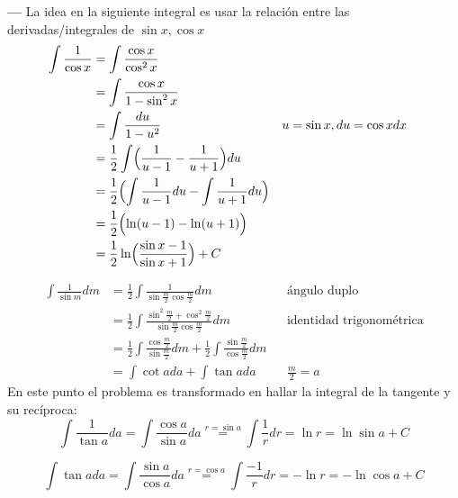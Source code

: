 \documentclass[14pt]{extarticle}
\begin{document}
\textbf{---} La idea en la siguiente integral es usar la relación entre las derivadas/integrales de $\sin x, \cos x$
\begin{align}
      \int \frac{1}{\cos x}
       & = \int \frac{\cos x}{\cos^2 x}                                                                                   \\
       & = \int \frac{\cos x}{1-\sin^2 x}                                                                                 \\
       & = \int \frac{du}{1-u^2}                                                 &  & \text{$u = \sin x, du = \cos x dx$} \\
       & = \frac{1}{2} \int  \Bigl(  \frac{1}{u-1} - \frac{1}{u+1}   \Bigr)du                                             \\
       & = \frac{1}{2} \Bigl( \int \frac{1}{u-1}du - \int \frac{1}{u+1}du \Bigr)                                          \\
       & =  \frac{1}{2} \Bigl(  \ln (u-1) - \ln (u+1) \Bigr)                                                              \\
       & = \frac{1}{2}\ln \Bigl( \frac{\sin x -1}{\sin x +1} \Bigr) + C
\end{align}


\begin{align}
\int \frac{1}{\sin m} dm
& = \frac{1}{2} \int \frac{1}{\sin{\frac{m}{2}}\cos{\frac{m}{2}}}dm                                                                 &  & \text{ángulo duplo}             \\
& = \frac{1}{2} \int \frac{\sin^2{\frac{m}{2}} + \cos^2{\frac{m}{2}}}{\sin{\frac{m}{2}}\cos{\frac{m}{2}}}dm                         &  & \text{identidad trigonométrica} \\
& = \frac{1}{2} \int \frac{\cos{\frac{m}{2}}}{\sin{\frac{m}{2}}}dm + \frac{1}{2} \int \frac{\sin{\frac{m}{2}}}{\cos{\frac{m}{2}}}dm                                      \\
& = \int \cot{a} da + \int \tan{a}da                                                                                                &  & \text{$\frac{m}{2} = a$}
\end{align}
En este punto el problema es transformado en hallar la integral de la tangente y su recíproca:
$$\int \frac{1}{\tan a} da = \int \frac{\cos a}{\sin a} da \stackrel{r = \sin{a}}{=} \int \frac{1}{r}dr = \ln{r} = \ln{\sin a}+C$$

$$\int \tan a da = \int \frac{\sin a}{\cos a}da \stackrel{r = \cos{a}}{=} \int \frac{-1}{r}dr = -\ln{r} = -\ln{\cos a}+C$$
\end{document}
